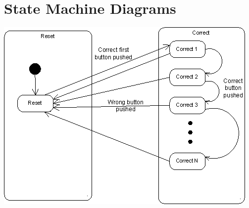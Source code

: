 \documentclass{article}
\begin{document}
\section{State Machine Diagrams}
  \includegraphics[width=\linewidth]{../state_hierarchical}
\end{document}
